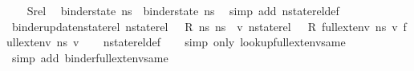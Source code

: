\begin{isabellebody}
\isamarkupfalse%
\isanewline
\ \ \isamarkupfalse%
\ Srel\ \isamarkupfalse%
\ {\isachardoublequoteopen}binder{\isacharunderscore}{\kern0pt}state\ ns{}\ {\isacharequal}{\kern0pt}\ binder{\isacharunderscore}{\kern0pt}state\ ns{}{\isachardoublequoteclose}\ \isamarkupfalse%
\ {\isacharparenleft}{\kern0pt}simp\ add{\isacharcolon}{\kern0pt}\ nstate{\isacharunderscore}{\kern0pt}rel{\isacharunderscore}{\kern0pt}def{\isacharparenright}{\kern0pt}\isanewline
{}\isamarkupfalse%
%
\endisatagproof
{\isafoldproof}%
%
\isadelimproof
\isanewline
%
\endisadelimproof
\isanewline
{}\isamarkupfalse%
\ binder{\isacharunderscore}{\kern0pt}update{\isacharunderscore}{\kern0pt}nstate{\isacharunderscore}{\kern0pt}rel{\isacharcolon}{\kern0pt}\ {\isachardoublequoteopen}nstate{\isacharunderscore}{\kern0pt}rel\ {\isasymLambda}\ {\isasymLambda}{\isacharprime}{\kern0pt}\ R\ ns{}\ ns{}\ {\isasymLongrightarrow}\ {\isacharparenleft}{\kern0pt}{\isasymAnd}v{\isachardot}{\kern0pt}\ nstate{\isacharunderscore}{\kern0pt}rel\ {\isasymLambda}\ {\isasymLambda}{\isacharprime}{\kern0pt}\ R\ {\isacharparenleft}{\kern0pt}full{\isacharunderscore}{\kern0pt}ext{\isacharunderscore}{\kern0pt}env\ ns{}\ v{\isacharparenright}{\kern0pt}\ {\isacharparenleft}{\kern0pt}full{\isacharunderscore}{\kern0pt}ext{\isacharunderscore}{\kern0pt}env\ ns{}\ v{\isacharparenright}{\kern0pt}{\isacharparenright}{\kern0pt}{\isachardoublequoteclose}\isanewline
%
\isadelimproof
\ \ %
\endisadelimproof
%
\isatagproof
{}\isamarkupfalse%
\ nstate{\isacharunderscore}{\kern0pt}rel{\isacharunderscore}{\kern0pt}def\isanewline
\ \ \isamarkupfalse%
\ {\isacharparenleft}{\kern0pt}simp\ only{\isacharcolon}{\kern0pt}\ lookup{\isacharunderscore}{\kern0pt}full{\isacharunderscore}{\kern0pt}ext{\isacharunderscore}{\kern0pt}env{\isacharunderscore}{\kern0pt}same{\isacharparenright}{\kern0pt}\isanewline
\ \ \isamarkupfalse%
\ {\isacharparenleft}{\kern0pt}simp\ add{\isacharcolon}{\kern0pt}\ binder{\isacharunderscore}{\kern0pt}full{\isacharunderscore}{\kern0pt}ext{\isacharunderscore}{\kern0pt}env{\isacharunderscore}{\kern0pt}same{\isacharparenright}{\kern0pt}%
\endisatagproof
{\isafoldproof}%
%
\isadelimproof
\isanewline
%
\endisadelimproof
\isanewline
{}\isamarkupfalse%

\end{isabellebody}
